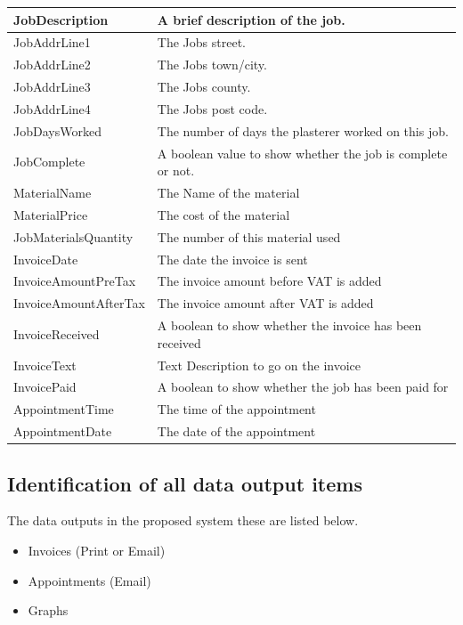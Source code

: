 \begin{flushleft}
\begin{longtable}{|p{3.5cm}|p{5cm}|}
JobDescription & A brief description of the job. \\ \hline
JobAddrLine1 & The Jobs street. \\ \hline
JobAddrLine2 & The Jobs town/city. \\ \hline
JobAddrLine3 & The Jobs county. \\ \hline
JobAddrLine4 & The Jobs post code. \\ \hline
JobDaysWorked & The number of days the plasterer worked on this job. \\ \hline
JobComplete & A boolean value to show whether the job is complete or not. \\ \hline \hline

MaterialName & The Name of the material \\ \hline
MaterialPrice & The cost of the material \\ \hline
JobMaterialsQuantity & The number of this material used \\ \hline \hline

InvoiceDate & The date the invoice is sent \\ \hline
InvoiceAmountPreTax & The invoice amount before VAT is added \\ \hline
InvoiceAmountAfterTax & The invoice amount after VAT is added \\ \hline
InvoiceReceived & A boolean to show whether the invoice has been received \\ \hline
InvoiceText & Text Description to go on the invoice \\ \hline 
InvoicePaid & A boolean to show whether the job has been paid for \\ \hline \hline

AppointmentTime & The time of the appointment \\ \hline
AppointmentDate & The date of the appointment \\ \hline 

\end{longtable}

\end{flushleft}


\subsection{Identification of all data output items}
\begin{flushleft}
The data outputs in the proposed system these are listed below.
\end{flushleft}
\begin{itemize}
\item Invoices (Print or Email)
\item Appointments (Email)
\item Graphs
\end{itemize}

